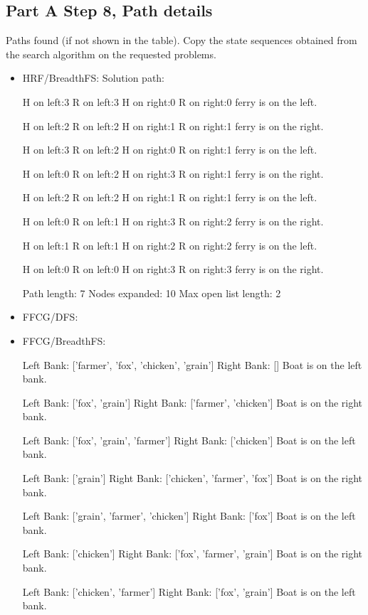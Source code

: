 \documentclass{article}
\begin{document}
\subsection{Part A Step 8, Path details}
 Paths found (if not shown in the table).  Copy the state sequences
 obtained from the search algorithm on the requested problems.

 \begin{itemize}
 \item HRF/BreadthFS:
 Solution path:

 H on left:3
 R on left:3
   H on right:0
   R on right:0
 ferry is on the left.


 H on left:2
 R on left:2
   H on right:1
   R on right:1
 ferry is on the right.


 H on left:3
 R on left:2
   H on right:0
   R on right:1
 ferry is on the left.


 H on left:0
 R on left:2
   H on right:3
   R on right:1
 ferry is on the right.


 H on left:2
 R on left:2
   H on right:1
   R on right:1
 ferry is on the left.


 H on left:0
 R on left:1
   H on right:3
   R on right:2
 ferry is on the right.


 H on left:1
 R on left:1
   H on right:2
   R on right:2
 ferry is on the left.


 H on left:0
 R on left:0
   H on right:3
   R on right:3
 ferry is on the right.

Path length: 7
Nodes expanded: 10
Max open list length: 2
 \item FFCG/DFS: 
 \item FFCG/BreadthFS:

 Left Bank: ['farmer', 'fox', 'chicken', 'grain']
Right Bank: []
Boat is on the left bank.

Left Bank: ['fox', 'grain']
Right Bank: ['farmer', 'chicken']
Boat is on the right bank.

Left Bank: ['fox', 'grain', 'farmer']
Right Bank: ['chicken']
Boat is on the left bank.

Left Bank: ['grain']
Right Bank: ['chicken', 'farmer', 'fox']
Boat is on the right bank.

Left Bank: ['grain', 'farmer', 'chicken']
Right Bank: ['fox']
Boat is on the left bank.

Left Bank: ['chicken']
Right Bank: ['fox', 'farmer', 'grain']
Boat is on the right bank.

Left Bank: ['chicken', 'farmer']
Right Bank: ['fox', 'grain']
Boat is on the left bank.


\end{itemize}
\end{document}
